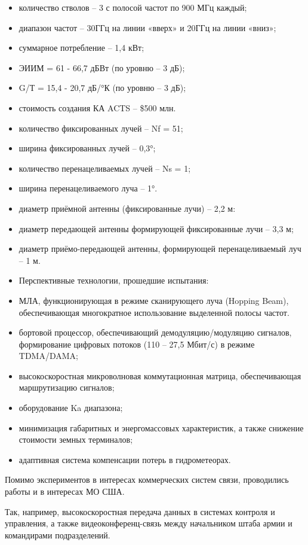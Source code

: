 \documentclass[14pt,a4paper,oneside]{extarticle}
\begin{document}
\begin{itemize}
    \item количество стволов – 3 с полосой частот по 900 МГц каждый;
    \item диапазон частот – 30ГГц на линии «вверх» и 20ГГц на линии «вниз»;
    \item суммарное потребление – 1,4 кВт;
    \item ЭИИМ = 61 - 66,7 дБВт (по уровню – 3 дБ);
    \item G/Т = 15,4 - 20,7 дБ/°К (по уровню – 3 дБ);
    \item стоимость создания КА ACTS – \$500 млн.
    \item количество фиксированных лучей – Nf = 51;
    \item ширина фиксированных лучей – 0,3°;
    \item количество перенацеливаемых лучей – Ns = 1;
    \item ширина перенацеливаемого луча – 1°.
    \item диаметр приёмной антенны (фиксированные лучи) – 2,2 м:
    \item диаметр передающей антенны формирующей фиксированные лучи – 3,3 м;
    \item диаметр приёмо-передающей антенны, формирующей перенацеливаемый луч – 1 м.
    \item Перспективные технологии, прошедшие испытания:
    \item МЛА, функционирующая в режиме сканирующего луча (Hopping Beam), обеспечивающая многократное использование выделенной полосы частот.
    \item бортовой процессор, обеспечивающий демодуляцию/модуляцию сигналов, формирование цифровых потоков (110 – 27,5 Мбит/с) в режиме TDMA/DAMA;
    \item высокоскоростная микроволновая коммутационная матрица, обеспечивающая маршрутизацию сигналов;
    \item оборудование Ka диапазона;
    \item минимизация габаритных и энергомассовых характеристик, а также снижение стоимости земных терминалов;
    \item адаптивная система компенсации потерь в гидрометеорах.
\end{itemize}

Помимо экспериментов в интересах коммерческих систем связи, проводились работы и в интересах МО США.

Так, например, высокоскоростная передача данных в системах контроля и управления, а также видеоконференц-связь между начальником штаба армии и командирами подразделений.
\end{document}
